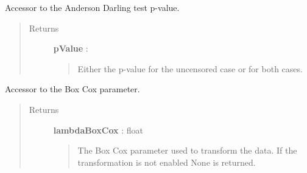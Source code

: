 \documentclass[letterpaper,10pt,english]{sphinxmanual}
\begin{document}
\begin{fulllineitems}
\begin{fulllineitems}
\begin{quote}
\begin{description}
\end{description}\end{quote}

\end{fulllineitems}


\begin{fulllineitems}
\label{_generated/otpod.UnivariateLinearModelAnalysis:otpod.UnivariateLinearModelAnalysis.getAndersonDarlingPValue}
Accessor to the Anderson Darling test p-value.
\begin{quote}\begin{description}
\item[{Returns}] \leavevmode
\textbf{pValue} : \href{http://doc.openturns.org/openturns-latest/sphinx/user\_manual/\_generated/openturns.NumericalPoint.html\#openturns.NumericalPoint}{}
\begin{quote}

Either the p-value for the uncensored case or for both cases.
\end{quote}

\end{description}\end{quote}

\end{fulllineitems}


\begin{fulllineitems}
\label{_generated/otpod.UnivariateLinearModelAnalysis:otpod.UnivariateLinearModelAnalysis.getBoxCoxParameter}
Accessor to the Box Cox parameter.
\begin{quote}\begin{description}
\item[{Returns}] \leavevmode
\textbf{lambdaBoxCox} : float
\begin{quote}

The Box Cox parameter used to transform the data. If the transformation
is not enabled None is returned.
\end{quote}

\end{description}\end{quote}

\end{fulllineitems}


\end{fulllineitems}
\end{document}
